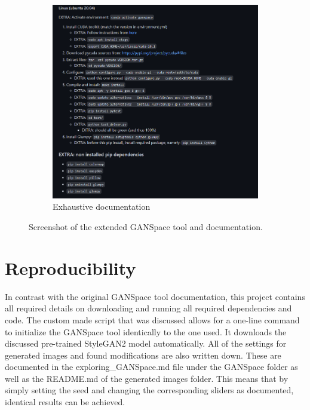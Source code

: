 \begin{figure}
\begin{subfigure}{.4\textwidth}
  \includegraphics[width=\textwidth]{images/documentation.PNG}
  \caption{Exhaustive documentation}
  \label{fig:extended_ganspace_doc}
\end{subfigure}
\captionsetup{width=.85\linewidth}
\caption{Screenshot of the extended GANSpace tool and documentation.}
\label{fig:extended_ganspace}
\end{figure}


\section{Reproducibility}
\label{sec:reproducibility_implement}

In contrast with the original GANSpace tool documentation, this project contains all required details on downloading and running all required dependencies and code.
The custom made script that was discussed allows for a one-line command to initialize the GANSpace tool identically to the one used.
It downloads the discussed pre-trained StyleGAN2 model automatically. 
All of the settings for generated images and found modifications are also written down.
These are documented in the exploring\_GANSpace.md file under the GANSpace folder as well as the README.md of the generated images folder.
This means that by simply setting the seed and changing the corresponding sliders as documented, identical results can be achieved.